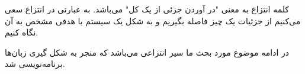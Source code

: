 \begin{flushright}
    کلمه انتزاع به معنی "در آوردن جزئی از یک کل" می‌باشد.
    به عبارتی در انتزاع سعی می‌کنیم از جزئیات یک چیز فاصله بگیریم و به شکل یک سیستم با هدفی مشخص به آن نگاه کنیم.

    در ادامه موضوع مورد بحث ما  سیر انتزاعی می‌باشد که منجر به شکل گیری زبان‌ها برنامه‌نویسی شد.
    \newpage
\end{flushright}